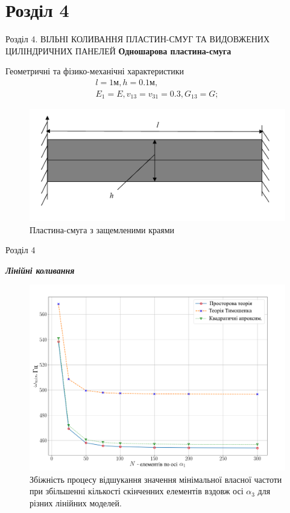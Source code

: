 \documentclass[8pt]{beamer}
\numberwithin{figure}{section}
\numberwithin{equation}{section}
\numberwithin{table}{section}
\begin{document}
\section{Розділ 4}
\begin{frame}{Розділ 4. ВІЛЬНІ КОЛИВАННЯ ПЛАСТИН-СМУГ ТА ВИДОВЖЕНИХ ЦИЛІНДРИЧНИХ ПАНЕЛЕЙ}
\textbf{Одношарова пластина-смуга}
\vspace{1em}

Геометричні та фізико-механічні характеристики
\begin{equation}
\begin{gathered}
l=1\text{м}, h=0.1\text{м},\\
E_1=E, v_{13}=v_{31}=0.3, G_{13}=G;
\end{gathered}
\end{equation}
\begin{figure}
	\includegraphics[scale=0.3]{pic/plate.png}
		\caption{Пластина-смуга з защемленими краями}
		\label{fig:plate}
\end{figure}



\end{frame}

\begin{frame}{Розділ 4}

\textbf{\textit{Лінійні коливання}}
\begin{figure}
	\includegraphics[scale=0.3]{pic/conv_allukr2.png}
		\caption{Збіжність процесу відшукання значення мінімальної власної частоти при збільшенні кількості скінченних елементів вздовж осі $\alpha_3$ для різних лінійних моделей.}
		\label{fig:EE31}
\end{figure}

\end{frame}
\end{document}
